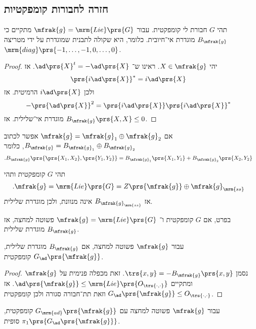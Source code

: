 \documentclass[10pt, twoside]{book}
\newcommand{\textenglish}[1]{\foreignlanguage{english}{#1}}
\newcommand{\Lie}{\mrm{Lie}}
\begin{document}
\subsection{חזרה לחבורות קומפקטיות}

\begin{proposition}
תהי
$G$
חבורת לי קומפקטית. עבור
$\mfrak{g} = \Lie\prs{G}$
מתקיים כי
$B_{\mfrak{g}}$
מוגדרת אי־חיובית.
כלומר, היא שקולה לתבנית שמוגדרת על ידי מטריצה
$\mrm{diag}\prs{-1, \ldots, -1, 0, \ldots, 0}$.
\end{proposition}

\begin{proof}
יהי
$X \in \mfrak{g}$.
ראינו ש־%
$\ad\prs{X}^t = -\ad\prs{X}$.
אז
\[\prs{i \ad\prs{X}}^* = i \ad\prs{X}\]
ולכן
$i \ad \prs{X}$
הרמיטית.
אז
\[-\prs{\ad\prs{X}}^2 = \prs{i \ad \prs{X}}\prs{i \ad\prs{X}}^*\]
מוגדרת אי־שלילית.
אז
$B_{\mfrak{g}}\prs{X,X} \leq 0$.
\end{proof}

\begin{remark}
אם
$\mfrak{g} = \mfrak{g}_1 \oplus \mfrak{g}_2$
אפשר לכתוב
$B_{\mfrak{g}} = B_{\mfrak{g}_1} \oplus B_{\mfrak{g}_2}$,
כלומר
\[\text{.} B_{\mfrak{g}}\prs{\prs{X_1, X_2}, \prs{Y_1, Y_2}} = B_{\mfrak{g}_1}\prs{X_1, Y_1} + B_{\mfrak{g}_2} \prs{X_2, Y_2}\]
\end{remark}

\begin{corollary}
תהי
$G$
קומפקטית ותהי
\[\text{.} \mfrak{g} = \Lie\prs{G} = Z\prs{\mfrak{g}} \oplus \mfrak{g}_{\mrm{ss}}\]
אז
$B_{\mfrak{g}_{\mrm{ss}}}$
אינה מנוונת, ולכן מוגדרת שלילית.

בפרט, אם
$G$
קומפקטית ו־%
$\mfrak{g} = \Lie\prs{G}$
פשוטה למחצה, אז
$B_{\mfrak{g}}$
מוגדרת שלילית.
\end{corollary}

\begin{proposition}
עבור
$\mfrak{g}$
פשוטה למחצה, אם
$B_{\mfrak{g}}$
מוגדרת שלילית,
$G_{\ad}\prs{\mfrak{g}}$
קומפקטית.
\end{proposition}

\begin{proof}
נסמן
$\trs{x,y} = -B_{\mfrak{g}}\prs{x,y}$.
זאת מכפלה פנימית על
$\mfrak{g}$
ומתקיים
$\ad\prs{\mfrak{g}} \leq \Lie\prs{O_{\trs{\cdot,\cdot}}}$.
אז
$G_{\ad}\prs{\mfrak{g}} \leq O_{\trs{\cdot,\cdot}}$
וזאת תת־חבורה סגורה ולכן קומפקטית.
\end{proof}

\begin{theorem}[\textenglish{Weyl}]
עבור
$\mfrak{g}$
פשוטה למחצה עם
$G_{\mrm{ad}}\prs{\mfrak{g}}$
קומפקטית,
$\pi_1\prs{G_{\ad}\prs{\mfrak{g}}}$
סופית.
\end{theorem}
\end{document}
